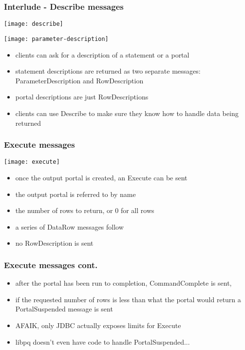 \documentclass{beamer}
\begin{document}
\begin{frame}
  \frametitle{Interlude - Describe messages}


  \begin{center}
    \texttt{[image: describe]} \\

    \bigskip

    \texttt{[image: parameter-description]}
  \end{center}

  \begin{itemize}
  \item clients can ask for a description of a statement or a portal
  \item statement descriptions are returned as two separate messages:
    ParameterDescription and RowDescription
  \item portal descriptions are just RowDescriptions
  \item clients can use Describe to make sure they know how to handle data
    being returned
  \end{itemize}
\end{frame}

\begin{frame}
  \frametitle{Execute messages}

  \begin{center}
    \texttt{[image: execute]}
  \end{center}

  \begin{itemize}
  \item once the output portal is created, an Execute can be sent
  \item the output portal is referred to by name
  \item the number of rows to return, or 0 for all rows
  \item a series of DataRow messages follow
  \item no RowDescription is sent
  \end{itemize}
\end{frame}

\begin{frame}
  \frametitle{Execute messages cont.}

  \begin{itemize}
  \item after the portal has been run to completion, CommandComplete is sent,
  \item if the requested number of rows is less than what the portal would
    return a PortalSuspended message is sent
  \item AFAIK, only JDBC actually exposes limits for Execute
  \item libpq doesn't even have code to handle PortalSuspended...
  \end{itemize}
\end{frame}
\end{document}
